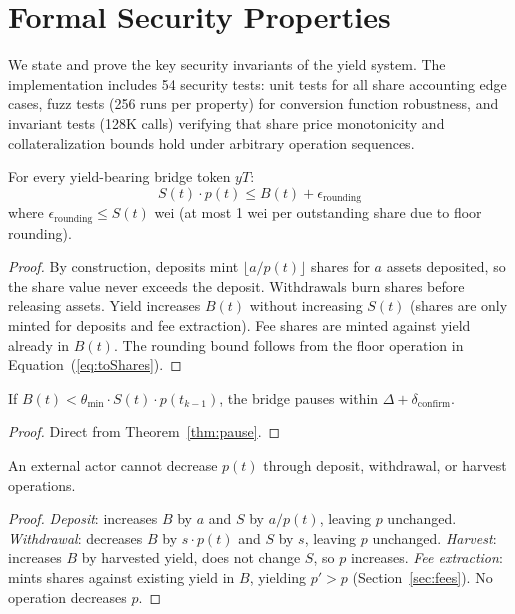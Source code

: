 \section{Formal Security Properties}
\label{sec:security}

We state and prove the key security invariants of the yield system. The implementation includes 54 security tests: unit tests for all share accounting edge cases, fuzz tests (256 runs per property) for conversion function robustness, and invariant tests (128K calls) verifying that share price monotonicity and collateralization bounds hold under arbitrary operation sequences.

\begin{property}[Conservation]\label{prop:conservation}
For every yield-bearing bridge token $yT$:
\begin{equation}
  S(t) \cdot p(t) \leq B(t) + \epsilon_{\text{rounding}}
\end{equation}
where $\epsilon_{\text{rounding}} \leq S(t)$ wei (at most 1 wei per outstanding share due to floor rounding).
\end{property}

\begin{proof}
By construction, deposits mint $\lfloor a / p(t) \rfloor$ shares for $a$ assets deposited, so the share value never exceeds the deposit. Withdrawals burn shares before releasing assets. Yield increases $B(t)$ without increasing $S(t)$ (shares are only minted for deposits and fee extraction). Fee shares are minted against yield already in $B(t)$. The rounding bound follows from the floor operation in Equation~(\ref{eq:toShares}).
\end{proof}

\begin{property}
If $B(t) < \theta_{\min} \cdot S(t) \cdot p(t_{k-1})$, the bridge pauses within $\Delta + \delta_{\text{confirm}}$.
\end{property}

\begin{proof}
Direct from Theorem~\ref{thm:pause}.
\end{proof}

\begin{property}
An external actor cannot decrease $p(t)$ through deposit, withdrawal, or harvest operations.
\end{property}

\begin{proof}
\textit{Deposit}: increases $B$ by $a$ and $S$ by $a/p(t)$, leaving $p$ unchanged.
\textit{Withdrawal}: decreases $B$ by $s \cdot p(t)$ and $S$ by $s$, leaving $p$ unchanged.
\textit{Harvest}: increases $B$ by harvested yield, does not change $S$, so $p$ increases.
\textit{Fee extraction}: mints shares against existing yield in $B$, yielding $p' > p$ (Section~\ref{sec:fees}).
No operation decreases $p$.
\end{proof}

